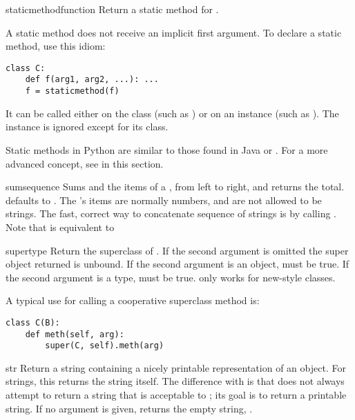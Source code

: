 \begin{funcdesc}{staticmethod}{function}
  Return a static method for .

  A static method does not receive an implicit first argument.
  To declare a static method, use this idiom:

\begin{verbatim}
class C:
    def f(arg1, arg2, ...): ...
    f = staticmethod(f)
\end{verbatim}

  It can be called either on the class (such as ) or on an
  instance (such as ).  The instance is ignored except
  for its class.

  Static methods in Python are similar to those found in Java or \Cpp.
  For a more advanced concept, see  in this
  section.
\end{funcdesc}

\begin{funcdesc}{sum}{sequence}
  Sums  and the items of a , from left to
  right, and returns the total.   defaults to .
  The 's items are normally numbers, and are not allowed
  to be strings.  The fast, correct way to concatenate sequence of
  strings is by calling .
  Note that  is equivalent to
\end{funcdesc}

\begin{funcdesc}{super}{type}
  Return the superclass of .  If the second argument is omitted
  the super object returned is unbound.  If the second argument is an
  object,  must be true.  If
  the second argument is a type,  must be true.
   only works for new-style classes.

  A typical use for calling a cooperative superclass method is:
\begin{verbatim}
class C(B):
    def meth(self, arg):
        super(C, self).meth(arg)
\end{verbatim}
\end{funcdesc}

\begin{funcdesc}{str}{}
  Return a string containing a nicely printable representation of an
  object.  For strings, this returns the string itself.  The
  difference with  is that
   does not always attempt to return a string
  that is acceptable to ; its goal is to return a
  printable string.  If no argument is given, returns the empty
  string, .
\end{funcdesc}

